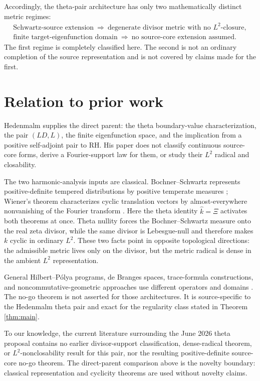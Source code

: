 \documentclass[11pt]{article}
\begin{document}
Accordingly, the theta-pair architecture has only two mathematically distinct metric regimes:
\[
\begin{gathered}
\text{Schwartz-source extension}
\ \Longrightarrow\ \text{degenerate divisor metric with no \(L^2\)-closure},\\[1mm]
\text{finite target-eigenfunction domain}
\ \Longrightarrow\ \text{no source-core extension assumed}.
\end{gathered}
\tag{7.1}
\]
The first regime is completely classified here.  The second is not an ordinary completion of the
source representation and is not covered by claims made for the first.

\section{Relation to prior work}\label{sec:literature}

Hedenmalm \cite{Hedenmalm2026} supplies the direct parent: the theta boundary-value
characterization, the pair \((LD,L)\), the finite eigenfunction space, and the implication from a
positive self-adjoint pair to RH.  His paper does not classify continuous source-core forms,
derive a Fourier-support law for them, or study their \(L^2\) radical and closability.

The two harmonic-analysis inputs are classical.  Bochner--Schwartz represents positive-definite
tempered distributions by positive temperate measures \cite{Schwartz1966}; Wiener's theorem
characterizes cyclic translation vectors by almost-everywhere nonvanishing of the Fourier
transform \cite{Wiener1932}.  Here the theta identity \(\widehat k=\Xi\) activates both theorems
at once.  Theta nullity forces the Bochner--Schwartz measure onto the real zeta divisor, while the
same divisor is Lebesgue-null and therefore makes \(k\) cyclic in ordinary \(L^2\).  These two
facts point in opposite topological directions: the admissible metric lives only on the divisor,
but the metric radical is dense in the ambient \(L^2\) representation.

General Hilbert--Pólya programs, de Branges spaces, trace-formula constructions, and
noncommutative-geometric approaches use different operators and domains
\cite{deBranges1968,Lagarias2006,Connes2026}.  The no-go theorem is not asserted for those
architectures.  It is source-specific to the Hedenmalm theta pair and exact for the regularity
class stated in Theorem \ref{thm:main}.

To our knowledge, the current literature surrounding the June 2026 theta proposal contains no earlier
divisor-support classification, dense-radical theorem, or \(L^2\)-nonclosability result for this
pair, nor the resulting positive-definite source-core no-go theorem.  The direct-parent comparison
above is the novelty boundary: classical representation and cyclicity theorems are used without
novelty claims.
\end{document}
